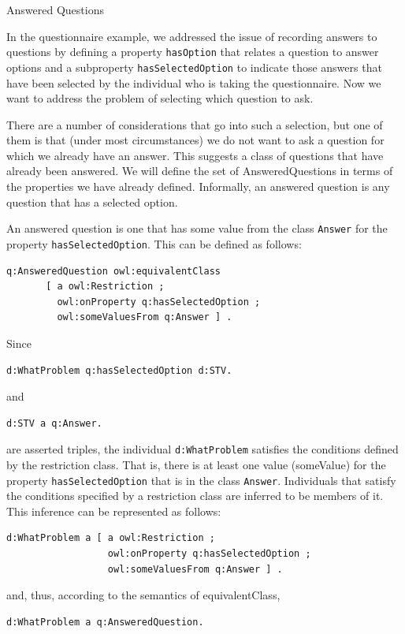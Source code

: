 \begin{example}{Answered Questions}

In the questionnaire example, we addressed the issue of recording
answers to questions by defining a property \texttt{hasOption} that relates a
question to answer options and a subproperty \texttt{hasSelectedOption} to
indicate those answers that have been selected by the individual who is
taking the questionnaire. Now we want to address the problem of
selecting which question to ask.

There are a number of considerations that go into such a selection, but
one of them is that (under most
circumstances) we do not want to ask a question for which we already
have an answer. This suggests a class of questions that have already
been answered. We will define the set of AnsweredQuestions in terms of
the properties we have already defined. Informally, an answered question
is any question that has a selected option.

An answered question is one that has some value from the class \texttt{Answer}
for the property
\texttt{hasSelectedOption}. This can be defined as follows:

\begin{lstlisting}
q:AnsweredQuestion owl:equivalentClass
       [ a owl:Restriction ;
         owl:onProperty q:hasSelectedOption ;
         owl:someValuesFrom q:Answer ] .
\end{lstlisting}

Since

\begin{lstlisting}
d:WhatProblem q:hasSelectedOption d:STV.
\end{lstlisting}

and

\begin{lstlisting}
d:STV a q:Answer.
\end{lstlisting}

are asserted triples, the individual \texttt{d:WhatProblem} satisfies the
conditions defined by the restriction class. That is, there is at least
one value (someValue) for the property \texttt{hasSelectedOption} that is
in the class \texttt{Answer}. Individuals that satisfy the conditions specified
by a restriction class are inferred to be members of it. This inference
can be represented as follows:

\begin{lstlisting}
d:WhatProblem a [ a owl:Restriction ;
                  owl:onProperty q:hasSelectedOption ;
                  owl:someValuesFrom q:Answer ] .
\end{lstlisting}

and, thus, according to the semantics of equivalentClass,

\begin{lstlisting}
d:WhatProblem a q:AnsweredQuestion.
\end{lstlisting}
\end{example}

